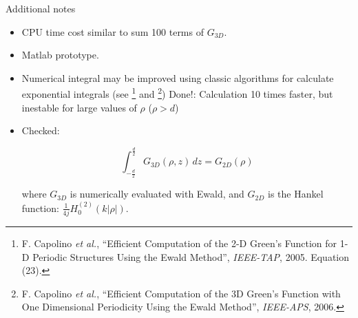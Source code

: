 \begin{frame}{Additional notes}
  \begin{itemize}
    \item CPU time cost similar to sum 100 terms of $G_{3D}$.
    \item Matlab prototype.
    \item Numerical integral may be improved using classic algorithms for 
      calculate exponential integrals (see %
        \footnote{
          F. Capolino \emph{et al.}, ``Efficient Computation of the 2-D Green's 
          Function for 1-D Periodic Structures Using the Ewald Method'', 
          \emph{IEEE-TAP}, 2005. Equation (23).
        } and
        \footnote{
          F. Capolino \emph{et al.}, ``Efficient Computation of the 3D Green's 
          Function with One Dimensional Periodicity Using the Ewald Method'', 
          \emph{IEEE-APS}, 2006.
        })
      {\color{red} Done!: Calculation 10 times faster, but inestable for large 
      values of $\rho$ ($\rho>d$)}
    \item
      Checked:

      \[
        \int_{-\frac{d}{2}}^{\frac{d}{2}}
        G_{3D}(\rho,z)\, dz
        =
        G_{2D}(\rho)
      \]

      where $G_{3D}$ is numerically evaluated with Ewald, and $G_{2D}$ is the 
      Hankel function: 
      $\frac{1}{4j} H_0^{(2)}(k|\rho|)$.

  \end{itemize}
\end{frame}
